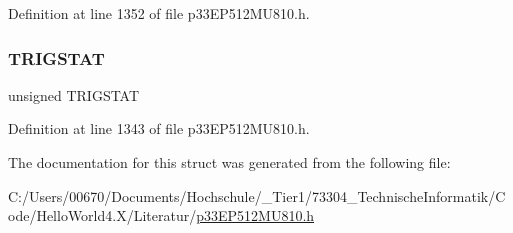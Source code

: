 Definition at line 1352 of file p33\+E\+P512\+M\+U810.\+h.

\mbox{\label{structtag_i_c15_c_o_n2_b_i_t_s_ab379549de54ac93ad4aa73686c34cb7c}} 
\subsubsection{\texorpdfstring{T\+R\+I\+G\+S\+T\+AT}{TRIGSTAT}}
{\footnotesize\ttfamily unsigned T\+R\+I\+G\+S\+T\+AT}



Definition at line 1343 of file p33\+E\+P512\+M\+U810.\+h.



The documentation for this struct was generated from the following file\+:\begin{DoxyCompactItemize}
\item 
C\+:/\+Users/00670/\+Documents/\+Hochschule/\+\_\+\+Tier1/73304\+\_\+\+Technische\+Informatik/\+Code/\+Hello\+World4.\+X/\+Literatur/\hyperlink{p33_e_p512_m_u810_8h}{p33\+E\+P512\+M\+U810.\+h}\end{DoxyCompactItemize}
